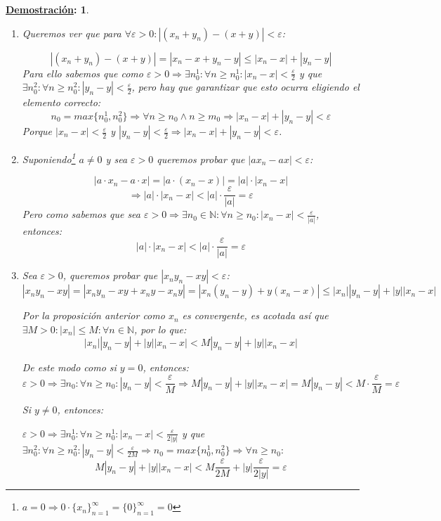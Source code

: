 \documentclass[10pt,a4paper,openright]{book}
\theoremstyle{break}
\newtheorem*{demo}{\underline{Demostración}:}
\begin{document}
\begin{demo}
\begin{enumerate}
\item Queremos ver que para $\forall \varepsilon>0: |(x_n+y_n)-(x+y)|<\varepsilon$:

$$|(x_n+y_n)-(x+y)|=|x_n-x+y_n-y|\leq |x_n-x|+|y_n-y|$$
Para ello sabemos que como $\varepsilon>0\Rightarrow\exists n_0^1: \forall n\geq n_0^1: |x_n-x|<\frac{\varepsilon}{2}$ y que $\exists n_0^2: \forall n \geq n_0^2: |y_n-y|<\frac{\varepsilon}{2}$, pero hay que garantizar que esto ocurra eligiendo el elemento correcto:
$$n_0=max\{n_0^1, n_0^2\}\Rightarrow \forall n\geq n_0\wedge n\geq m_0\Rightarrow |x_n-x|+|y_n-y|<\varepsilon$$
Porque $|x_n-x|<\frac{\varepsilon}{2}$ y $|y_n-y|<\frac{\varepsilon}{2}\Rightarrow |x_n-x|+|y_n-y|<\varepsilon$.
\vspace{0.35cm}

\item Suponiendo\footnote{$a=0\Rightarrow 0\cdot \{x_n\}_{n=1}^\infty=\{0\}_{n=1}^\infty=0$} $a\neq 0$ y sea $\varepsilon>0$ queremos probar que $|ax_n-ax|<\varepsilon$:

$$|a\cdot x_n-a\cdot x|=|a\cdot (x_n-x)|=|a|\cdot |x_n-x|$$
$$\Rightarrow |a|\cdot |x_n-x| < |a|\cdot \frac{\varepsilon}{|a|}=\varepsilon$$
Pero como sabemos que sea $\varepsilon>0\Rightarrow \exists n_0\in \mathbb N: \forall n\geq n_0: |x_n-x|<\frac{\varepsilon}{|a|}$, entonces:
$$|a|\cdot |x_n-x| < |a|\cdot \frac{\varepsilon}{|a|}=\varepsilon$$

\item Sea $\varepsilon>0$, queremos probar que $|x_ny_n-xy|<\varepsilon$:
$$|x_ny_n-xy|=|x_ny_n-xy+x_ny-x_ny|=|x_n(y_n-y)+y(x_n-x)|\leq |x_n||y_n-y|+|y||x_n-x|$$

Por la proposición anterior como $x_n$ es convergente, es acotada así que $\exists M>0: |x_n|\leq M: \forall n\in \mathbb N$, por lo que:
$$|x_n||y_n-y|+|y||x_n-x|< M|y_n-y|+|y||x_n-x|$$

De este modo como si $y=0$, entonces:
$$\varepsilon>0\Rightarrow\exists n_0: \forall n\geq n_0: |y_n-y|<\frac{\varepsilon}{M}\Rightarrow M|y_n-y|+|y||x_n-x|=M|y_n-y|<M\cdot \frac{\varepsilon}{M}=\varepsilon$$

Si $y\neq 0$, entonces:\par
$\varepsilon>0\Rightarrow\exists n_0^1: \forall n\geq n_0^1: |x_n-x|<\frac{\varepsilon}{2|y|}$ y que $\exists n_0^2: \forall n \geq n_0^2: |y_n-y|<\frac{\varepsilon}{2M}\Rightarrow n_0=max\{n_0^1, n_0^2\}\Rightarrow \forall n\geq n_0:$
$$M|y_n-y|+|y||x_n-x|< M\frac{\varepsilon}{2M}+|y|\frac{\varepsilon}{2|y|}=\varepsilon$$


\end{enumerate}
\end{demo}
\end{document}
